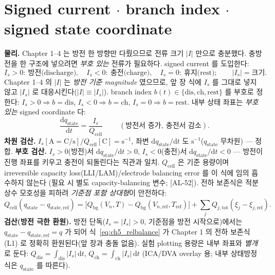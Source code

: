 \documentclass[11pt,a4paper]{article}
\newcommand{\dd}{\mathrm{d}}
\newcommand{\bg}{\mathrm{bg}}
\newcommand{\cell}{\mathrm{cell}}
\newcommand{\tot}{\mathrm{tot}}
\newcommand{\dis}{\mathrm{dis}}
\newcommand{\chg}{\mathrm{ch}}
\newcommand{\rst}{\mathrm{rest}}
\newcommand{\stt}{\mathrm{state}}
\newcommand{\AL}[1]{\textsf{[AL-#1]}}
\begin{document}
\section{Signed current $\cdot$ branch index $\cdot$ signed state coordinate}\label{sec:ch5_signed}
\textbf{물리.} Chapter 1--4 는 방전 한 방향만 다뤘으므로 전류 크기 $|I|$ 만으로 충분했다. 충방전을 한 구조에
넣으려면 \emph{부호 있는} 전류가 필요하다. signed current 를 도입한다:
\begin{equation}
I_s>0:\ \text{방전(discharge)},\quad I_s<0:\ \text{충전(charge)},\quad I_s=0:\ \text{휴지(rest)};\qquad |I_s|=\text{크기}.
\label{eq:ch5_signed_current}
\end{equation}
Chapter 1--4 의 $|I|$ 는 \emph{방전 기준 magnitude} 였으므로, 앞 장 식에 $I_s$ 를 그대로 넣지 않고 $|I_s|$ 로
대응시킨다($|I|\equiv|I_s|$). branch index $b(t)\in\{\dis,\chg,\rst\}$ 를 부호로 정한다:
$I_s>0\Rightarrow b=\dis$, $I_s<0\Rightarrow b=\chg$, $I_s=0\Rightarrow b=\rst$. 내부 상태 좌표는 \emph{부호
있는} signed coordinate 다:
\begin{equation}
\boxed{\;\frac{\dd q_\stt}{\dd t}=\frac{I_s}{Q_\cell}\;}\qquad(\text{방전서 증가},\ \text{충전서 감소}).
\label{eq:ch5_qstate}
\end{equation}
\textbf{차원 검산.} $I_s[\mathrm A=\mathrm{C/s}]/Q_\cell[\mathrm C]=\mathrm{s^{-1}}$, 좌변 $\dd q_\stt/\dd t$ 도
$\mathrm{s^{-1}}$($q_\stt$ 무차원) — 정합. \textbf{부호 검산.} $I_s>0$(방전)서 $\dd q_\stt/\dd t>0$,
$I_s<0$(충전)서 $\dd q_\stt/\dd t<0$ — 방전이 진행 좌표를 키우고 충전이 되돌린다는 직관과 일치. $Q_\cell$ 은
기준 용량이며 irreversible capacity loss(LLI/LAM)/electrode balancing error 를 이 식에 임의 흡수하지 않는다
(필요 시 별도 capacity-balancing 변수; \AL{52}). 전하 보존식은 적분 상수 모호성을 피하려 \emph{기준점 포함
상대형}이 안전하다:
\begin{equation}
Q_\cell(q_\stt-q_{\stt,\mathrm{ref}})=\big[Q_\bg(V_n,T)-Q_\bg(V_{n,\mathrm{ref}},T_{\mathrm{ref}})\big]
+\sum_j Q_{j,\tot}(\xi_j-\xi_{j,\mathrm{ref}}).
\label{eq:ch5_relbalance}
\end{equation}
\textbf{검산(방전 극한 환원).} 방전 단독($I_s=|I_s|>0$, 기준점을 방전 시작으로)에서는 $q_\stt-q_{\stt,\mathrm{ref}}
=q$ 가 되어 식~\eqref{eq:ch5_relbalance} 가 Chapter 1 의 전하 보존식 (L1) 로 정확히 환원된다(앞 장과 충돌
없음). 실험 plotting 용량은 내부 좌표와 \emph{별개}로 둔다: $Q_\dis=\int_\dis|I_s|\,\dd t$,
$Q_\chg=\int_\chg|I_s|\,\dd t$ (ICA/DVA overlay 용; 내부 상태방정식은 $q_\stt$ 를 따른다).
\end{document}
